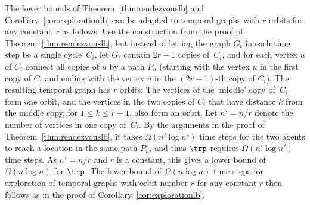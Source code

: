 {The lower bounds of Theorem~\ref{thm:rendezvouslb} and
Corollary~\ref{cor:explorationlb} can be adapted to temporal graphs with $r$
orbits for any constant~$r$ as follows: Use the construction from the proof of
Theorem~\ref{thm:rendezvouslb}, but instead of letting the graph $G_t$ in each
time step be a single cycle~$C_i$, let $G_t$ contain $2r-1$ copies of~$C_i$, and
for each vertex $u$ of $C_i$ connect all copies of $u$ by a path $P_u$ (starting
with the vertex $u$ in the first copy of $C_i$ and ending with the vertex $u$ in
the $(2r-1)$-th copy of $C_i$). The resulting temporal graph has $r$ orbits: The
vertices of the `middle' copy of~$C_i$ form one orbit, and the vertices in the
two copies of $C_i$ that have distance $k$ from the middle copy, for $1\le k\le
r-1$, also form an orbit. Let $n'=n/r$ denote the number of vertices in one copy
of~$C_i$. By the arguments in the proof of Theorem~\ref{thm:rendezvouslb}, it
takes $\Omega(n'\log n')$ time steps for the two agents to reach a location in
the same path $P_u$, and thus $\trp$ requires $\Omega(n'\log n')$ time steps. As
$n'=n/r$ and $r$ is a constant, this gives a lower bound of $\Omega(n\log n)$
for $\trp$. The lower bound of $\Omega(n \log n)$ time steps for exploration of
temporal graphs with orbit number $r$ for any constant $r$ then follows as in
the proof of Corollary~\ref{cor:explorationlb}.}


